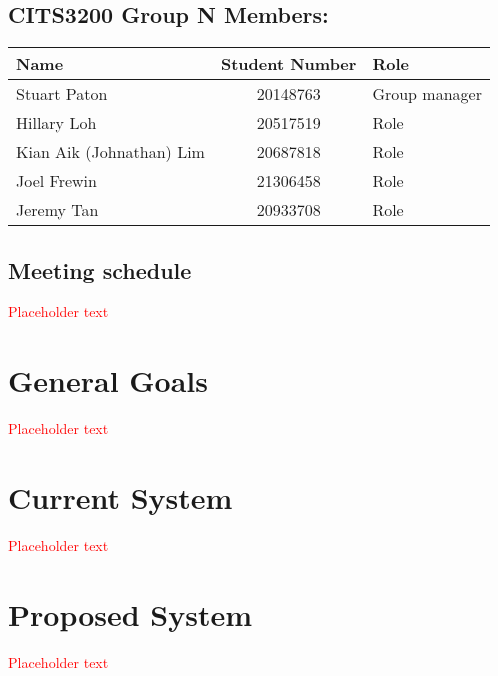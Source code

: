 \documentclass[a4paper, 11pt, titlepage]{article}
\begin{document}
\subsection*{CITS3200 Group N Members:}
\begin{table}[H]
\centering
\begin{tabular}{lcl}
	\hline
	Name & Student Number & Role \\
	\hline
	Stuart Paton & 20148763  & Group manager\\
	Hillary Loh & 20517519 & Role\\
	Kian Aik (Johnathan) Lim & 20687818 & Role \\
	Joel Frewin & 21306458 & Role\\
	Jeremy Tan & 20933708 & Role\\
\end{tabular}
\end{table}


\pagebreak


\subsection*{Meeting schedule}
\textcolor{red}{Placeholder text}

\pagebreak

\begingroup
\linespread{0.7}
\hypersetup{linkcolor=black}
\tableofcontents
\endgroup

\pagebreak
{}

\section{General Goals}
\textcolor{red}{Placeholder text}

\section{Current System}
\textcolor{red}{Placeholder text}

\section{Proposed System}
\textcolor{red}{Placeholder text}
\end{document}
